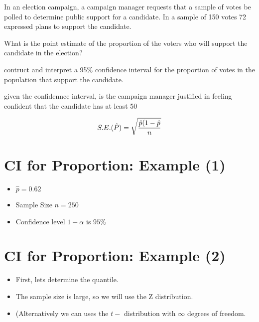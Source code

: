 

In an election campaign, a campaign manager requests that a sample of votes be polled to determine public support for a candidate. In a sample of 150 votes 72 expressed plans to support the candidate.

What is the point estimate of the proportion of the voters who will support the candidate in the election?

contruct and interpret a 95\% confidence interval for the proportion of votes in the population that support the candidate.

given the confidennce interval, is the campaign manager justified in feeling confident that the candidate has at least 50%

\[S.E. (\hat{P}) = \sqrt{{\hat{p}(1-\hat{p} \over n}}\]
\newpage

\section{CI for Proportion: Example (1)}

\begin{itemize}
\item $\hat{p}  = 0.62$
\item Sample Size $n=250$
\item Confidence level $1-\alpha$ is $95\%$
\end{itemize}



\section{CI for Proportion: Example (2)}

\begin{itemize}
\item First, lets determine the quantile.
\item The sample size is large, so we will use the Z distribution.
\item (Alternatively we can uses the $t-$ distribution with $\infty$ degrees of freedom.
\end{itemize}

